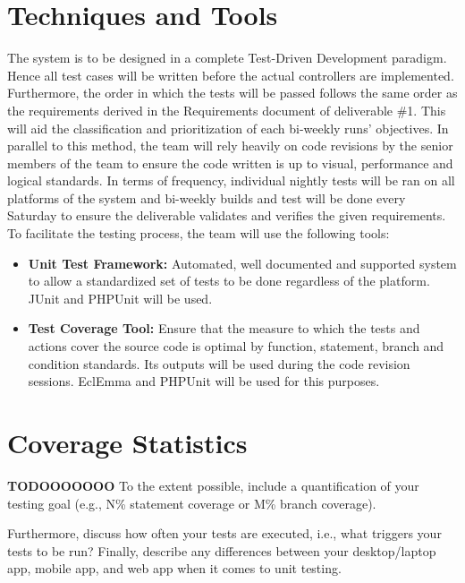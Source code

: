 \documentclass[12pt]{report}
\begin{document}
    \section{Techniques and Tools}
    
    The system is to be designed in a complete Test-Driven Development paradigm. Hence all test cases will be written before the actual controllers are implemented. Furthermore, the order in which the tests will be passed follows the same order as the requirements derived in the Requirements document of deliverable \#1. This will aid the classification and prioritization of each bi-weekly runs' objectives. In parallel to this method, the team will rely heavily on code revisions by the senior members of the team to ensure the code written is up to visual, performance and logical standards. In terms of frequency, individual nightly tests will be ran on all platforms of the system and bi-weekly builds and test will be done every Saturday to ensure the deliverable validates and verifies the given requirements. To facilitate the testing process, the team will use the following tools:
    
    \begin{itemize}
        \item \textbf{Unit Test Framework:} Automated, well documented and supported system to allow a standardized set of tests to be done regardless of the platform. JUnit and PHPUnit will be used.
        \item \textbf{Test Coverage Tool:} Ensure that the measure to which the tests and actions cover the source code is optimal by function, statement, branch and condition standards. Its outputs will be used during the code revision sessions. EclEmma and PHPUnit will be used for this purposes.
    \end{itemize}
    
    \section{Coverage Statistics}
    
    \textbf{TODOOOOOOO}
    To the extent possible, include a quantification of your testing goal (e.g., N\% statement coverage or M\% branch coverage). 
    
    Furthermore, discuss how often your tests are executed, i.e., what triggers your tests to be run? Finally, describe any differences between your desktop/laptop app, mobile app, and web app when it comes to unit testing.
\end{document}

